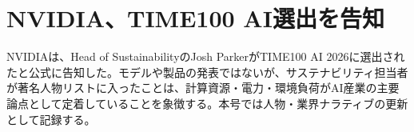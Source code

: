\section{NVIDIA、TIME100 AI選出を告知}
NVIDIAは、Head of SustainabilityのJosh ParkerがTIME100 AI 2026に選出されたと公式に告知した。モデルや製品の発表ではないが、サステナビリティ担当者が著名人物リストに入ったことは、計算資源・電力・環境負荷がAI産業の主要論点として定着していることを象徴する。本号では人物・業界ナラティブの更新として記録する。
